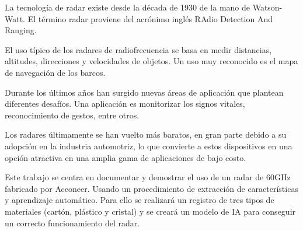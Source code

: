 
La tecnología de radar existe desde la década de 1930 de la mano de Watson-Watt.
El término radar proviene del acrónimo inglés RAdio Detection And Ranging.

El uso típico de los radares de radiofrecuencia se basa en  medir distancias, altitudes, direcciones y velocidades de objetos. Un uso muy reconocido es el mapa de navegación de los barcos.

Durante los últimos años han surgido nuevas áreas de aplicación que plantean
diferentes desafíos. Una aplicación es monitorizar los signos vitales, reconocimiento de gestos, entre otros.

Los radares últimamente se han vuelto más baratos, en gran parte debido a su
adopción en la industria automotriz, lo que convierte a estos dispositivos en una
opción atractiva en una amplia gama de aplicaciones de bajo costo.


Este trabajo se centra en documentar y demostrar el uso de un radar de 60GHz fabricado por Acconeer. Usando un procedimiento de extracción de características y aprendizaje automático.
Para ello se realizará un registro de tres tipos de materiales (cartón, plástico y cristal) y se creará un modelo de IA para conseguir un correcto funcionamiento del radar.
